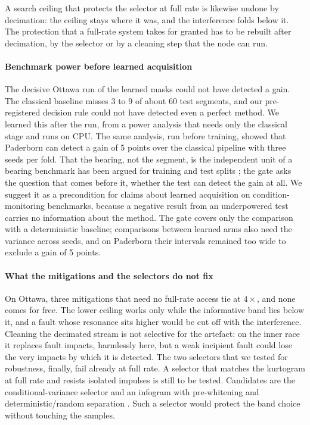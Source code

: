 A search ceiling that protects the selector at full rate is likewise undone by decimation: the
ceiling stays where it was, and the interference folds below it. The protection that a full-rate
system takes for granted has to be rebuilt after decimation, by the selector or by a cleaning step
that the node can run.

\paragraph{Benchmark power before learned acquisition}
The decisive Ottawa run of the learned masks could not have detected a gain. The classical
baseline misses 3 to 9 of about 60 test segments, and our pre-registered decision rule could not
have detected even a perfect method. We learned this after the run, from a power analysis that
needs only the classical stage and runs on CPU. The same analysis, run before training, showed that
Paderborn can detect a gain of 5 points over the classical pipeline with three seeds per fold. That
the bearing, not the segment, is the independent unit of a bearing benchmark has been argued for
training and test splits \citep{hendriks2022cwrubench}; the gate asks the question that comes
before it, whether the test can detect the gain at all. We suggest it as a precondition for claims
about learned acquisition on condition-monitoring benchmarks, because a negative result from an
underpowered test carries no information about the method. The gate covers only the comparison
with a deterministic baseline; comparisons between learned arms also need the variance across
seeds, and on Paderborn their intervals remained too wide to exclude a gain of 5 points.

\paragraph{What the mitigations and the selectors do not fix}
On Ottawa, three mitigations that need no full-rate access tie at $4\times$, and none comes for
free. The lower ceiling works only while the informative band lies below it, and a fault whose
resonance sits higher would be cut off with the interference. Cleaning the decimated stream is not
selective for the artefact: on the inner race it replaces fault impacts, harmlessly here, but a weak
incipient fault could lose the very impacts by which it is detected. The two selectors that we
tested for robustness, finally, fail already at full rate. A selector that matches the kurtogram at
full rate and resists isolated impulses is still to be tested. Candidates are the
conditional-variance selector \citep{hebdasobkowicz2020condvar} and an infogram with pre-whitening
and deterministic/random separation \citep{antoni2016infogram}. Such a selector would protect the
band choice without touching the samples.

